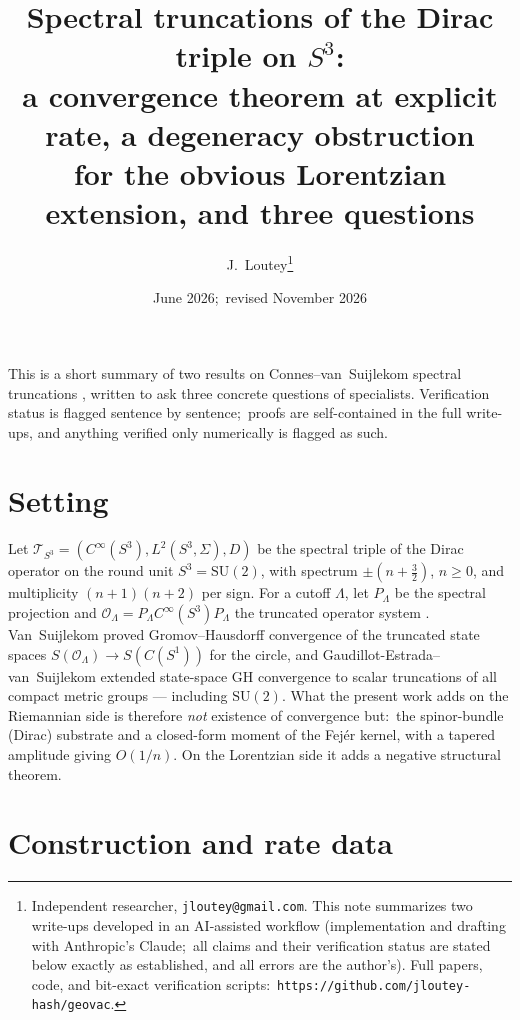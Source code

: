 \documentclass[11pt]{article}
\title{Spectral truncations of the Dirac triple on $S^3$:\\
a convergence theorem at explicit rate, a degeneracy obstruction\\
for the obvious Lorentzian extension, and three questions}
\author{J.~Loutey\thanks{Independent researcher,
\texttt{jloutey@gmail.com}. This note summarizes two write-ups
developed in an AI-assisted workflow (implementation and drafting
with Anthropic's Claude;\ all claims and their verification status
are stated below exactly as established, and all errors are the
author's). Full papers, code, and bit-exact verification scripts:\
\texttt{https://github.com/jloutey-hash/geovac}.}}
\date{June 2026;\ revised November 2026}
\theoremstyle{remark}
\newcommand{\Op}{\mathcal{O}}
\newcommand{\DCH}{D}
\begin{document}
\maketitle

\noindent This is a short summary of two results on
Connes--van~Suijlekom spectral truncations
\cite{CvS2021}, written to ask three concrete questions of
specialists. Verification status is flagged sentence by
sentence;\ proofs are self-contained in the full write-ups, and
anything verified only numerically is flagged as such.

\section{Setting}

Let $\mathcal{T}_{S^3} = (C^\infty(S^3), L^2(S^3, \Sigma), \DCH)$ be
the spectral triple of the Dirac operator on the round unit
$S^3 = \mathrm{SU}(2)$, with spectrum $\pm(n + \tfrac32)$,
$n \ge 0$, and multiplicity $(n+1)(n+2)$ per sign. For a cutoff
$\Lambda$, let $P_\Lambda$ be the spectral projection and
$\Op_\Lambda = P_\Lambda C^\infty(S^3) P_\Lambda$ the truncated
operator system \cite{CvS2021}. Van~Suijlekom \cite{vS2021} proved
Gromov--Hausdorff convergence of the truncated state spaces
$S(\Op_\Lambda) \to S(C(S^1))$ for the circle, and
Gaudillot-Estrada--van~Suijlekom \cite{GEvS2023} extended state-space
GH convergence to scalar truncations of all compact metric groups ---
including $\mathrm{SU}(2)$. What the present work adds on the
Riemannian side is therefore \emph{not} existence of convergence but:\
the spinor-bundle (Dirac) substrate and a closed-form moment of the
Fej\'er kernel, with a tapered amplitude giving $O(1/n)$. On the Lorentzian side it
adds a negative structural theorem.

\section{Construction and rate data}
\end{document}
